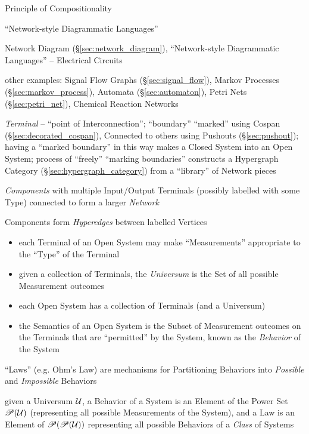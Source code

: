 Principle of Compositionality

``Network-style Diagrammatic Languages''

Network Diagram (\S\ref{sec:network_diagram}), ``Network-style
Diagrammatic Languages'' -- Electrical Circuits

other examples: Signal Flow Graphs (\S\ref{sec:signal_flow}),
Markov Processes (\S\ref{sec:markov_process}), Automata
(\S\ref{sec:automaton}), Petri Nets (\S\ref{sec:petri_net}), Chemical
Reaction Networks

\emph{Terminal} -- ``point of Interconnection''; ``boundary''
``marked'' using Cospan (\S\ref{sec:decorated_cospan}), Connected to
others using Pushouts (\S\ref{sec:pushout}); having a ``marked
boundary'' in this way makes a Closed System into an Open System;
process of ``freely''  ``marking boundaries'' constructs a Hypergraph
Category (\S\ref{sec:hypergraph_category}) from a ``library'' of
Network pieces

\emph{Components} with multiple Input/Output Terminals (possibly
labelled with some Type) connected to form a larger \emph{Network}

Components form \emph{Hyperedges} between labelled Vertices

\begin{itemize}
  \item each Terminal of an Open System may make ``Measurements''
    appropriate to the ``Type'' of the Terminal
  \item given a collection of Terminals, the \emph{Universum} is the
    Set of all possible Measurement outcomes
  \item each Open System has a collection of Terminals (and a Universum)
  \item the Semantics of an Open System is the Subset of Measurement
    outcomes on the Terminals that are ``permitted'' by the System,
    known as the \emph{Behavior} of the System
\end{itemize}


``Laws'' (e.g. Ohm's Law) are mechanisms for Partitioning Behaviors
into \emph{Possible} and \emph{Impossible} Behaviors

given a Universum $\mathcal{U}$, a Behavior of a System is an Element
of the Power Set $\mathscr{P}(\mathcal{U})$ (representing all possible
Measurements of the System), and a Law is an Element of
$\mathscr{P}(\mathscr{P}(\mathcal{U}))$ representing all possible Behaviors of a
\emph{Class} of Systems

